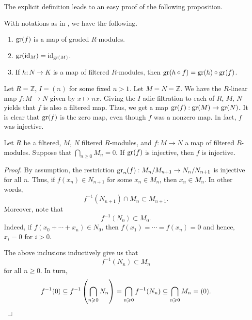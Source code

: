 The explicit definition leads to an easy proof of the following proposition.

\begin{prop}
	With notations as in , we have the following.
	\begin{enumerate}
		\item $\gr(f)$ is a map of graded $R$-modules.
		\item $\gr(\id_{M}) = \id_{\gr(M)}$.
		\item If $h : N \to K$ is a map of filtered $R$-modules, then $\gr(h \circ f) = \gr(h) \circ \gr(f)$.
	\end{enumerate}
\end{prop}

\begin{ex}
	Let $R = \mathbb{Z}$, $I = (n)$ for some fixed $n > 1$. Let $M = N = \mathbb{Z}$. We have the $R$-linear map $f : M \to N$ given by $x \mapsto nx$. Giving the $I$-adic filtration to each of $R$, $M$, $N$ yields that $f$ is also a filtered map. Thus, we get a map $\gr(f) : \gr(M) \to \gr(N)$. It is clear that $\gr(f)$ is the zero map, even though $f$ was a nonzero map. In fact, $f$ was injective.
\end{ex}

\begin{prop}
	Let $R$ be a filtered, $M$, $N$ filtered $R$-modules, and $f : M \to N$ a map of filtered $R$-modules. Suppose that $\bigcap_{n \ge 0} M_{n} = 0$. \newline
	If $\gr(f)$ is injective, then $f$ is injective.
\end{prop}
\begin{proof} 
	By assumption, the restriction $\gr_{n}(f) : M_{n}/M_{n + 1} \to N_{n}/N_{n + 1}$ is injective for all $n$. Thus, if $f(x_{n}) \in N_{n + 1}$ for some $x_{n} \in M_{n}$, then $x_{n} \in M_{n}$. In other words, 
	\begin{equation*} 
		f^{-1}(N_{n + 1}) \cap M_{n} \subset M_{n + 1}.
	\end{equation*}
	Moreover, note that 
	\begin{equation*} 
		f^{-1}(N_{0}) \subset M_{0}.
	\end{equation*} 
	Indeed, if $f(x_{0} + \cdots + x_{n}) \in N_{0}$, then $f(x_{1}) = \cdots = f(x_{n}) = 0$ and hence, $x_{i} = 0$ for $i > 0$.

	The above inclusions inductively give us that
	\begin{equation*} 
		f^{-1}(N_{n}) \subset M_{n}
	\end{equation*}
	for all $n \ge 0$. In turn,
	\begin{equation*} 
		f^{-1}(0) \subset f^{-1}\left(\bigcap_{n \ge 0} N_{n}\right) = \bigcap_{n \ge 0} f^{-1}(N_{n}) \subset \bigcap_{n \ge 0} M_{n} = (0). \qedhere
	\end{equation*}
\end{proof}

